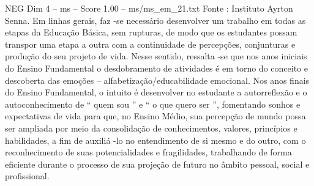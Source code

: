 \begin{textsample}{NEG Dim 4 – ms – Score 1.00 – ms/ms\_em\_21.txt}
Fonte : Instituto Ayrton Senna.
Em linhas gerais, faz -se necessário desenvolver um trabalho em todas as etapas da Educação Básica, sem rupturas, de modo que os estudantes possam transpor uma etapa a outra com a continuidade de percepções, conjunturas e produção do seu projeto de vida.
Nesse sentido, ressalta -se que nos anos iniciais do Ensino Fundamental o desdobramento de atividades é em torno do conceito e descoberta das emoções – alfabetização/educabilidade emocional.
Nos anos finais do Ensino Fundamental, o intuito é desenvolver no estudante a autorreflexão e o autoconhecimento de “ quem sou ” e “ o que quero ser ”, fomentando sonhos e expectativas de vida para que, no Ensino Médio, sua percepção de mundo possa ser ampliada por meio da consolidação de conhecimentos, valores, princípios e habilidades, a fim de auxiliá -lo no entendimento de si mesmo e do outro, com o reconhecimento de suas potencialidades e fragilidades, trabalhando de forma eficiente durante o processo de sua projeção de futuro no âmbito pessoal, social e profissional.

\end{textsample}
